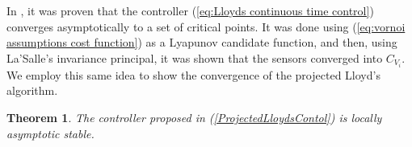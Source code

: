 \documentclass{iacas}
\newtheorem{theorem}{Theorem}
\begin{document}
In \cite{Cortes2004}, it was proven that the controller (\ref{eq:Lloyds continuous time control}) converges asymptotically to a set of critical points. It was done using (\ref{eq:vornoi assumptions cost function}) as a Lyapunov candidate function, and then, using La'Salle's invariance principal, it was shown that the sensors converged into $C_{V_i}$.  We employ this same idea to show the convergence of the projected Lloyd's algorithm.
\begin{theorem}
The controller proposed in (\ref{ProjectedLloydsContol}) is locally asymptotic stable.
\end{theorem}
\end{document}
